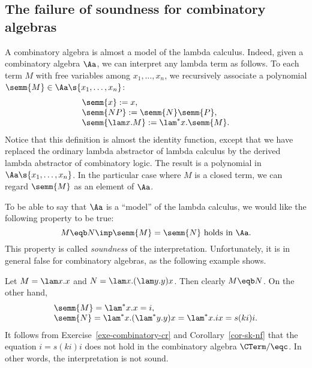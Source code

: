\documentclass[12pt]{article}
\begin{document}
\subsection{The failure of soundness for combinatory algebras}

A combinatory algebra is almost a model of the lambda calculus.
Indeed, given a combinatory algebra $\Aa$, we can interpret any lambda
term as follows. To each term $M$ with free variables among
$x_1,\ldots,x_n$, we recursively associate a polynomial
$\semm{M}\in\Aa\s{x_1,\ldots,x_n}$:
\[ \begin{array}{lll}
  \semm{x} := x, \\
  \semm{NP} := \semm{N}\semm{P}, \\
  \semm{\lam x.M} := \lam^*x.\semm{M}.\\
\end{array}
\]
Notice that this definition is almost the identity function, except
that we have replaced the ordinary lambda abstractor of lambda
calculus by the derived lambda abstractor of combinatory logic. The
result is a polynomial in $\Aa\s{x_1,\ldots,x_n}$. In the particular
case where $M$ is a closed term, we can regard $\semm{M}$ as an
element of $\Aa$.

To be able to say that $\Aa$ is a ``model'' of the lambda calculus, we
would like the following property to be true:
\[ M\eqb N \imp \semm{M}=\semm{N}\mbox{ holds in $\Aa$}.
\]
This property is called {\em soundness} of the interpretation.
Unfortunately, it is in general false for combinatory algebras, as the
following example shows.

\begin{example}\label{exa-failure-sound}
  Let $M=\lam x.x$ and $N=\lam x.(\lam y.y)x$. Then clearly
  $M\eqb N$. On the other hand, 
  \[ \begin{array}{l}
    \semm{M} = \lam^*x.x=i, \\
    \semm{N} = \lam^*x.(\lam^*y.y)x = \lam^*x.ix
    = s(ki)i.
  \end{array}
  \]
  It follows from Exercise~\ref{exe-combinatory-cr} and
  Corollary~\ref{cor-sk-nf} that the equation $i=s(ki)i$ does not hold
  in the combinatory algebra $\CTerm/{\eqc}$. In other words, the
  interpretation is not sound.
\end{example}
\end{document}
